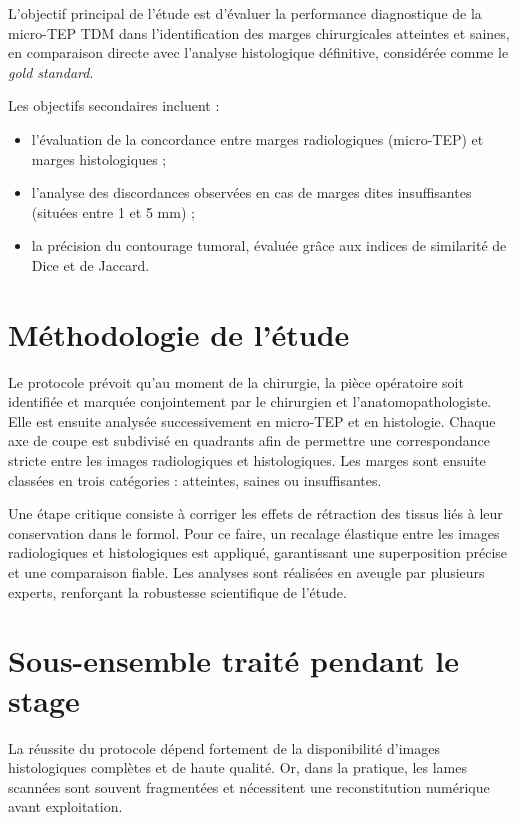 \documentclass[12pt,a4paper]{report}
\begin{document}
L'objectif principal de l'étude est d'évaluer la performance diagnostique de la micro-TEP TDM dans l'identification des marges chirurgicales atteintes et saines, en comparaison directe avec l'analyse histologique définitive, considérée comme le \textit{gold standard}.

Les objectifs secondaires incluent :
\begin{itemize}
\item l'évaluation de la concordance entre marges radiologiques (micro-TEP) et marges histologiques ;
\item l'analyse des discordances observées en cas de marges dites insuffisantes (situées entre 1 et 5 mm) ;
\item la précision du contourage tumoral, évaluée grâce aux indices de similarité de Dice et de Jaccard.
\end{itemize}

\section{Méthodologie de l'étude}

Le protocole prévoit qu'au moment de la chirurgie, la pièce opératoire soit identifiée et marquée conjointement par le chirurgien et l'anatomopathologiste. Elle est ensuite analysée successivement en micro-TEP et en histologie. Chaque axe de coupe est subdivisé en quadrants afin de permettre une correspondance stricte entre les images radiologiques et histologiques. Les marges sont ensuite classées en trois catégories : atteintes, saines ou insuffisantes.

Une étape critique consiste à corriger les effets de rétraction des tissus liés à leur conservation dans le formol. Pour ce faire, un recalage élastique entre les images radiologiques et histologiques est appliqué, garantissant une superposition précise et une comparaison fiable. Les analyses sont réalisées en aveugle par plusieurs experts, renforçant la robustesse scientifique de l'étude.

\section{Sous-ensemble traité pendant le stage}

La réussite du protocole dépend fortement de la disponibilité d'images histologiques complètes et de haute qualité. Or, dans la pratique, les lames scannées sont souvent fragmentées et nécessitent une reconstitution numérique avant exploitation.
\end{document}
